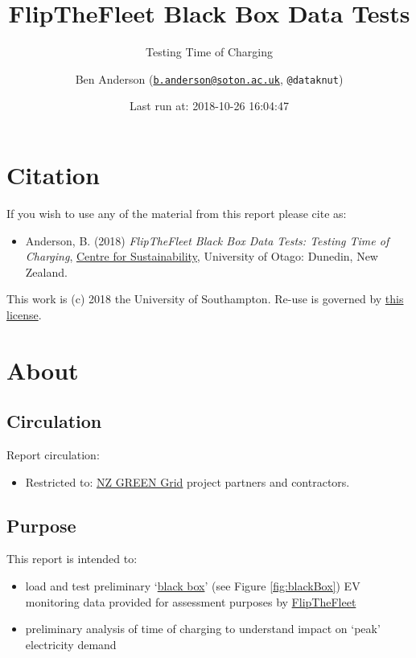 \documentclass[]{article}
\title{FlipTheFleet Black Box Data Tests}
\subtitle{Testing Time of Charging}
\author{Ben Anderson
(\href{mailto:b.anderson@soton.ac.uk}{\nolinkurl{b.anderson@soton.ac.uk}},
\texttt{@dataknut})}
\date{Last run at: 2018-10-26 16:04:47}
\providecommand{\tightlist}{%
  \setlength{\itemsep}{0pt}\setlength{\parskip}{0pt}}
\begin{document}
\maketitle

{
\setcounter{tocdepth}{2}
\tableofcontents
}
\newpage

\section{Citation}\label{citation}

If you wish to use any of the material from this report please cite as:

\begin{itemize}
\tightlist
\item
  Anderson, B. (2018) \emph{FlipTheFleet Black Box Data Tests: Testing
  Time of Charging},
  \href{http://www.otago.ac.nz/centre-sustainability/}{Centre for
  Sustainability}, University of Otago: Dunedin, New Zealand.
\end{itemize}

This work is (c) 2018 the University of Southampton. Re-use is governed
by \href{https://github.com/CfSOtago/GREENGrid/blob/master/LICENSE}{this
license}.

\newpage

\section{About}\label{about}

\subsection{Circulation}\label{circulation}

Report circulation:

\begin{itemize}
\tightlist
\item
  Restricted to:
  \href{https://www.otago.ac.nz/centre-sustainability/research/energy/otago050285.html}{NZ
  GREEN Grid} project partners and contractors.
\end{itemize}

\subsection{Purpose}\label{purpose}

This report is intended to:

\begin{itemize}
\tightlist
\item
  load and test preliminary
  `\href{https://flipthefleet.org/ev-black-box/}{black box}' (see Figure
  \ref{fig:blackBox}) EV monitoring data provided for assessment
  purposes by \href{http://flipthefleet.org/}{FlipTheFleet}
\item
  preliminary analysis of time of charging to understand impact on
  `peak' electricity demand
\end{itemize}
\end{document}
